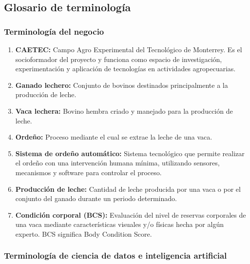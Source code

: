 \subsection{Glosario de terminología}

\subsubsection{Terminología del negocio}

\begin{enumerate}
  \item \textbf{CAETEC:} Campo Agro Experimental del Tecnológico de Monterrey. Es el socioformador del proyecto y funciona como espacio de investigación, experimentación y aplicación de tecnologías en actividades agropecuarias.
  \item \textbf{Ganado lechero:} Conjunto de bovinos destinados principalmente a la producción de leche.
  \item \textbf{Vaca lechera:} Bovino hembra criado y manejado para la producción de leche.
  \item \textbf{Ordeño:} Proceso mediante el cual se extrae la leche de una vaca.
  \item \textbf{Sistema de ordeño automático:} Sistema tecnológico que permite realizar el ordeño con una intervención humana mínima, utilizando sensores, mecanismos y software para controlar el proceso.
  \item \textbf{Producción de leche:} Cantidad de leche producida por una vaca o por el conjunto del ganado durante un periodo determinado.
  \item \textbf{Condición corporal (BCS):} Evaluación del nivel de reservas corporales de una vaca mediante características visuales y/o físicas hecha por algún experto. BCS significa Body Condition Score.
\end{enumerate}

\subsubsection{Terminología de ciencia de datos e inteligencia artificial}

